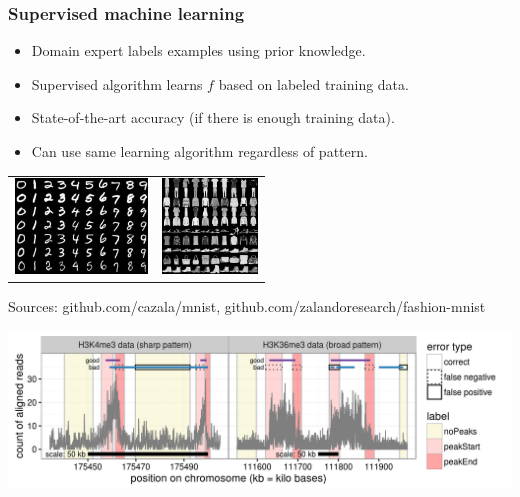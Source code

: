 \documentclass{beamer}
\begin{document}
\begin{frame}
  \frametitle{Supervised machine learning }

  \begin{itemize}
  \item Domain expert labels examples using prior knowledge.
  \item Supervised algorithm learns $f$ based on labeled training data.
  \item State-of-the-art accuracy (if there is enough training data).
  \item Can use same learning algorithm regardless of pattern.
  \end{itemize}

  \begin{tabular}{cc}
  \includegraphics[height=1in]{mnist-digits} &
  \includegraphics[height=1in]{fashion-mnist-sprite-some}  
  \end{tabular}

  \scriptsize Sources: github.com/cazala/mnist, github.com/zalandoresearch/fashion-mnist

  \includegraphics[width=\textwidth]{figure-good-bad}
\end{frame}
\end{document}
